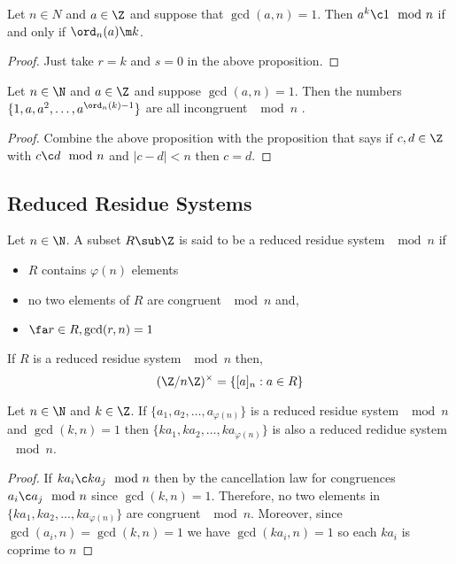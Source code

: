 \begin{ncor}
   Let $n \in N$ and $a \in \Z$ and suppose that $\gcd(a, n) = 1$. Then $a^k \c 1 \mod n$ if and only if $\ord_n(a) \m k$.
\end{ncor}
\begin{proof}
  Just take $r = k$ and $s = 0$ in the above proposition.
\end{proof}

\begin{ncor}
   Let $n \in \N$ and $a \in \Z$ and suppose $\gcd(a, n) = 1$. Then the numbers $\{1, a, a^2,\dots, a^{\ord_n(k) - 1}\}$ are all incongruent $\mod n$ .
\end{ncor}
\begin{proof}
  Combine the above proposition with the proposition that says if $c, d \in \Z$ with $c \c d \mod n$ and $|c - d| < n$ then $c = d$.
\end{proof}

\subsection{Reduced Residue Systems}

\begin{ndefi}
  Let $n \in \N$. A subset $R \sub \Z$ is said to be a reduced residue system $\mod n$ if
  \begin{itemize}
    \item $R$ contains $\varphi(n)$ elements
    \item no two elements of $R$ are congruent $\mod n$ and,
    \item $\fa r \in R, \gcd(r, n) = 1$
  \end{itemize}
\end{ndefi}
\begin{remark}
   If $R$ is a reduced residue system $\mod n$ then,
   $$ (\Z/n\Z)^\times = \{[a]_n : a \in R\} $$
\end{remark}

\begin{nprop}
   Let $n \in \N$ and $k \in \Z$. If $\{a_1, a_2, \dots, a_{\varphi(n)}\}$ is a reduced residue system $\mod n$ and $\gcd(k, n) = 1$ then $\{ka_1, ka_2, \dots, ka_{\varphi(n)}\}$ is also a reduced redidue system $\mod n$.
\end{nprop}
\begin{proof}
  If $ka_i \c ka_j\mod n$ then by the cancellation law for congruences $a_i \c a_j\mod n$ since $\gcd(k, n) =1$. Therefore, no two elements in $\{ka_1, ka_2, \dots, ka_{\varphi(n)}\}$ are congruent $\mod n$. Moreover, since $\gcd(a_i, n) = \gcd(k, n) = 1$ we have $\gcd(ka_i, n) = 1$ so each $ka_i$ is coprime to $n$
\end{proof}

